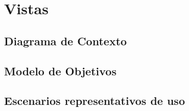
\section{Vistas}
\fixme

\newpage

  \subsection{Diagrama de Contexto}
  \fixme

  \newpage


  \subsection{Modelo de Objetivos}
  \fixme
  
  \newpage
  
  \subsection{Escenarios representativos de uso}
  \fixme